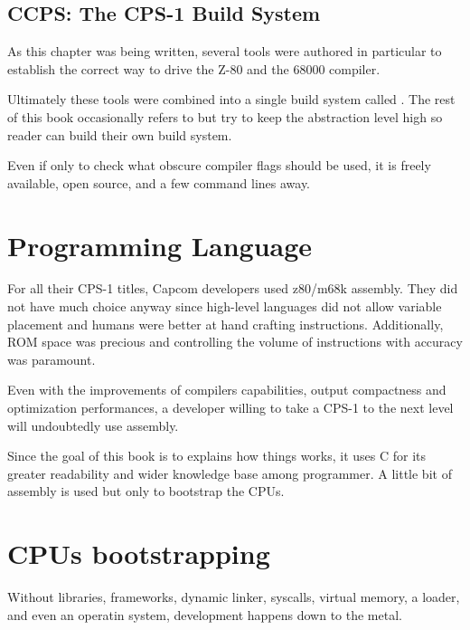 \subsection{CCPS: The CPS-1 Build System}
As this chapter was being written, several tools were authored in particular to establish the correct way to drive the Z-80 and the 68000 compiler. 

Ultimately these tools were combined into a single build system called . The rest of this book occasionally refers to  but try to keep the abstraction level high so reader can build their own build system. 

Even if only to check what obscure compiler flags should be used, it is freely available, open source, and a few command lines away.






\section{Programming Language}
For all their CPS-1 titles, Capcom developers used z80/m68k assembly. They did not have much choice anyway since high-level languages did not allow variable placement and humans were better at hand crafting instructions. Additionally, ROM space was precious and controlling the volume of instructions with accuracy was paramount.

Even with the improvements of compilers capabilities, output compactness and optimization performances, a developer willing to take a CPS-1 to the next level will undoubtedly use assembly.

Since the goal of this book is to explains how things works, it uses C for its greater readability and wider knowledge base among programmer. A little bit of assembly is used but only to bootstrap the CPUs.
	
\section{CPUs bootstrapping}
Without libraries, frameworks, dynamic linker, syscalls, virtual memory, a loader, and even an operatin system, development happens down to the metal. 

